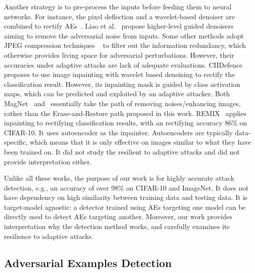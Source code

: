 \documentclass[sigconf]{acmart}
\begin{document}
Another strategy is to pre-process the inputs before feeding them to neural networks. For instance, the pixel deflection and a wavelet-based denoiser are combined to rectify AEs~\cite{prakash2018deflecting}. Liao et al.~\cite{liao2018defense} propose higher-level guided denoisers aiming to remove the adversarial noise from inputs. Some other methods adopt JPEG compression techniques 
~\cite{prakash2018protecting,guo2017countering} to filter out the information redundancy, which otherwise 
provides living space for adversarial perturbations. However, their accuracies under adaptive attacks are lack of adequate evaluations. CIIDefence~\cite{gupta2019ciidefence} proposes to use image inpainting with wavelet based denoising to rectify the classification result. However, its inpainting mask is guided by class activation maps, which can be predicted and exploited by an adaptive attacker. Both MagNet~\cite{meng2017magnet} and~\cite{chenposter} essentially take the path of removing noises/enhancing images, rather than the Erase-and-Restore path proposed in this work. REMIX~\cite{chenposter} applies inpainting to rectifying classification results, {with an rectifying accuracy
86\% on CIFAR-10}. It uses autoencoder as the inpainter. Autoencoders are typically data-specific, which means that it is only effective on images similar to what they have been trained on. {It did not
study the resilient to adaptive attacks and did not provide interpretation either.}

{Unlike all these works, the purpose of our work is for highly accurate attack detection, e.g., an accuracy of over 98\% 
on CIFAR-10 and ImageNet. It does not have dependency on high similarity
between training data and testing data. It is target-model agnostic: a detector trained using AEs targeting one model 
can be directly used to detect AEs targeting another.
Moreover, our work provides interpretation why the detection method works, and carefully examines its resilience to adaptive attacks.} 

\subsection{Adversarial Examples Detection}
\end{document}
